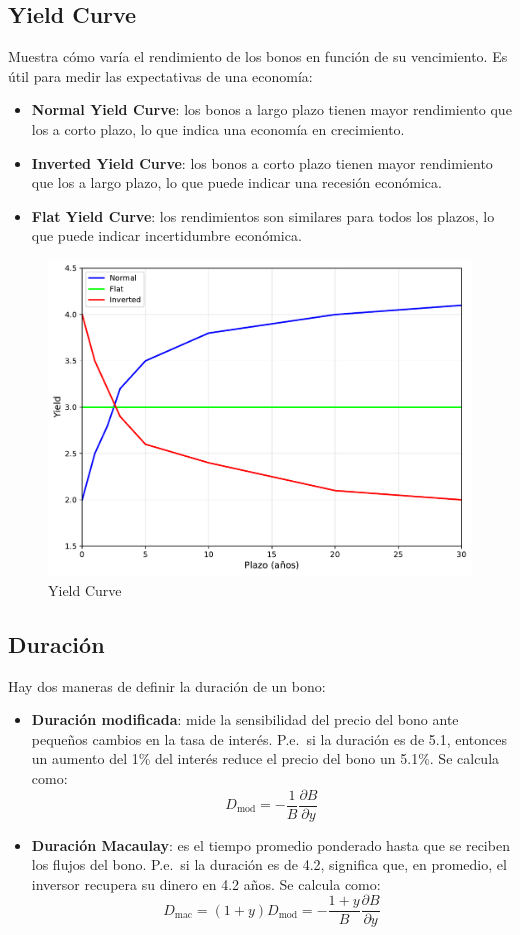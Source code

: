 \subsection{Yield Curve}
Muestra cómo varía el rendimiento de los bonos en función de su vencimiento. Es útil para medir las expectativas de una economía:
\begin{itemize}
    \item \textbf{Normal Yield Curve}: los bonos a largo plazo tienen mayor rendimiento que los a corto plazo, lo que indica una economía en crecimiento.
    \item \textbf{Inverted Yield Curve}: los bonos a corto plazo tienen mayor rendimiento que los a largo plazo, lo que puede indicar una recesión económica.
    \item \textbf{Flat Yield Curve}: los rendimientos son similares para todos los plazos, lo que puede indicar incertidumbre económica.
\end{itemize}
\begin{figure}[H]
    \centering
    \includegraphics[width=0.65\linewidth]{Imagenes/Parte1/11_Prods_renta_fija/Yield_Curve.pdf}
    \caption{Yield Curve}
\end{figure}




\subsection{Duración}
Hay dos maneras de definir la duración de un bono:
\begin{itemize}
    \item \textbf{Duración modificada}: mide la sensibilidad del precio del bono ante pequeños cambios en la tasa de interés. P.e.\ si la duración es de 5.1, entonces un aumento  del 1\% del interés reduce el precio del bono un 5.1\%. Se calcula como:
    \[
        \boxed{D_{\text{mod}} =  -\frac{1}{B}\frac{\partial B}{\partial y}}
    \]
    \item \textbf{Duración Macaulay}: es el tiempo promedio ponderado hasta que se reciben los flujos del bono. P.e.\ si la duración es de 4.2, significa que, en promedio, el inversor recupera su dinero en 4.2 años. Se calcula como:
    \[
        \boxed{D_{\text{mac}} = (1+y)D_{\text{mod}} = -\frac{1+y}{B}\frac{\partial B}{\partial y}}
    \]
\end{itemize}

